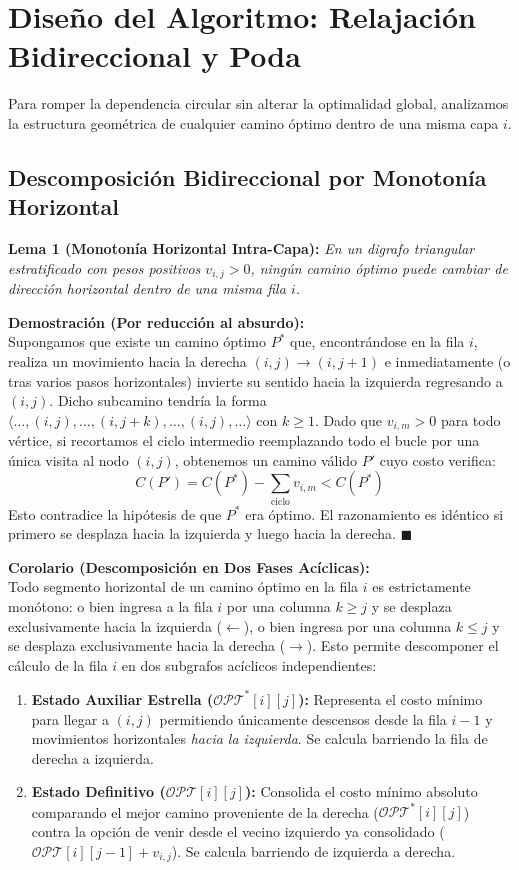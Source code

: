 \section{Diseño del Algoritmo: Relajación Bidireccional y Poda}

Para romper la dependencia circular sin alterar la optimalidad global, analizamos la estructura geométrica de cualquier camino óptimo dentro de una misma capa $i$.

\subsection{Descomposición Bidireccional por Monotonía Horizontal}

\textbf{Lema 1 (Monotonía Horizontal Intra-Capa):} \textit{En un digrafo triangular estratificado con pesos positivos $v_{i,j} > 0$, ningún camino óptimo puede cambiar de dirección horizontal dentro de una misma fila $i$.}

\textbf{Demostración (Por reducción al absurdo):} \\
Supongamos que existe un camino óptimo $P^*$ que, encontrándose en la fila $i$, realiza un movimiento hacia la derecha $(i, j) \to (i, j+1)$ e inmediatamente (o tras varios pasos horizontales) invierte su sentido hacia la izquierda regresando a $(i, j)$. Dicho subcamino tendría la forma $\langle \dots, (i, j), \dots, (i, j+k), \dots, (i, j), \dots \rangle$ con $k \geq 1$. Dado que $v_{i,m} > 0$ para todo vértice, si recortamos el ciclo intermedio reemplazando todo el bucle por una única visita al nodo $(i, j)$, obtenemos un camino válido $P'$ cuyo costo verifica:
\[
    C(P') = C(P^*) - \sum_{\text{ciclo}} v_{i,m} < C(P^*)
\]
Esto contradice la hipótesis de que $P^*$ era óptimo. El razonamiento es idéntico si primero se desplaza hacia la izquierda y luego hacia la derecha. $\blacksquare$

\vspace{1ex}
\noindent\textbf{Corolario (Descomposición en Dos Fases Acíclicas):} \\
Todo segmento horizontal de un camino óptimo en la fila $i$ es estrictamente monótono: o bien ingresa a la fila $i$ por una columna $k \geq j$ y se desplaza exclusivamente hacia la izquierda ($\leftarrow$), o bien ingresa por una columna $k \leq j$ y se desplaza exclusivamente hacia la derecha ($\rightarrow$). Esto permite descomponer el cálculo de la fila $i$ en dos subgrafos acíclicos independientes:
\begin{enumerate}
    \item \textbf{Estado Auxiliar Estrella ($\mathcal{OPT}^*[i][j]$):} Representa el costo mínimo para llegar a $(i,j)$ permitiendo únicamente descensos desde la fila $i-1$ y movimientos horizontales \textit{hacia la izquierda}. Se calcula barriendo la fila de derecha a izquierda.
    \item \textbf{Estado Definitivo ($\mathcal{OPT}[i][j]$):} Consolida el costo mínimo absoluto comparando el mejor camino proveniente de la derecha ($\mathcal{OPT}^*[i][j]$) contra la opción de venir desde el vecino izquierdo ya consolidado ($\mathcal{OPT}[i][j-1] + v_{i,j}$). Se calcula barriendo de izquierda a derecha.
\end{enumerate}

